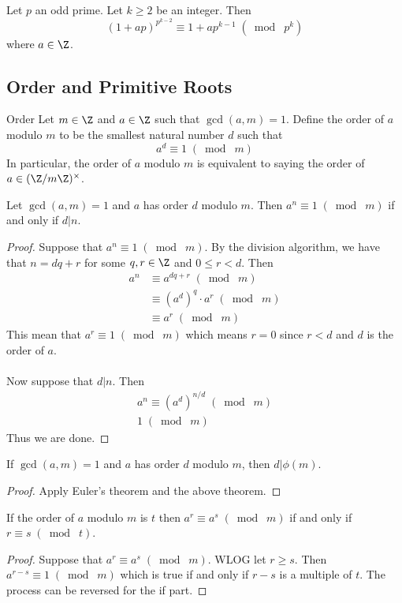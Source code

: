 \begin{crl}{}{} Let $p$ an odd prime. Let $k\geq 2$ be an integer. Then $$(1+ap)^{p^{k-2}}\equiv1+ap^{k-1}\;(\bmod\;p^k)$$ where $a\in\Z$. 
\end{crl}

\subsection{Order and Primitive Roots}
\begin{defn}{Order}{} Let $m\in\Z$ and $a\in\Z$ such that $\gcd(a,m)=1$. Define the order of $a$ modulo $m$ to be the smallest natural number $d$ such that $$a^d\equiv 1\;(\bmod\;m)$$ In particular, the order of $a$ modulo $m$ is equivalent to saying the order of $a\in(\Z/m\Z)^\times$. 
\end{defn}

\begin{thm}{}{} Let $\gcd(a,m)=1$ and $a$ has order $d$ modulo $m$. Then $a^n\equiv 1\;(\bmod\;m)$ if and only if $d|n$. \tcbline
\begin{proof}
Suppose that $a^n\equiv1\;(\bmod\;m)$. By the division algorithm, we have that $n=dq+r$ for some $q,r\in\Z$ and $0\leq r<d$. Then 
\begin{align*}
a^n&\equiv a^{dq+r}\;(\bmod\;m)\\
&\equiv (a^d)^q\cdot a^r\;(\bmod\;m)\\
&\equiv a^r\;(\bmod\;m)
\end{align*}
This mean that $a^r\equiv 1\;(\bmod\;m)$ which means $r=0$ since $r<d$ and $d$ is the order of $a$. \\~\\
Now suppose that $d|n$. Then
\begin{align*}
a^n\equiv (a^{d})^{n/d}\;(\bmod\;m)\\
1\;(\bmod\;m)
\end{align*}
Thus we are done. 
\end{proof}
\end{thm}

\begin{lmm}{}{} If $\gcd(a,m)=1$ and $a$ has order $d$ modulo $m$, then $d|\phi(m)$. \tcbline
\begin{proof}
Apply Euler's theorem and the above theorem. 
\end{proof}
\end{lmm}

\begin{thm}{}{} If the order of $a$ modulo $m$ is $t$ then $a^r\equiv a^s\;(\bmod\;m)$ if and only if $r\equiv s\;(\bmod\;t)$. \tcbline
\begin{proof}
Suppose that $a^r\equiv a^s\;(\bmod\;m)$. WLOG let $r\geq s$. Then $a^{r-s}\equiv 1\;(\bmod\;m)$ which is true if and only if $r-s$ is a multiple of $t$. The process can be reversed for the if part. 
\end{proof}
\end{thm}

